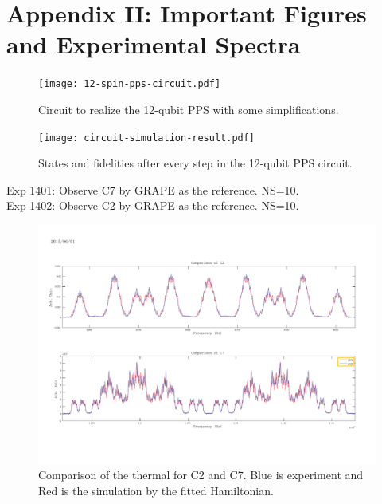 \clearpage
\section{Appendix II: Important Figures and Experimental Spectra}

\begin{figure}[htb]
\begin{center}
\texttt{[image: 12-spin-pps-circuit.pdf]}
\end{center}
\setlength{\abovecaptionskip}{-0.35cm}
\caption{\footnotesize{Circuit to realize the 12-qubit PPS with some simplifications.}}\label{12-spin-pps-circuit}
\end{figure}

\begin{figure}[htb]
\begin{center}
\texttt{[image: circuit-simulation-result.pdf]}
\end{center}
\setlength{\abovecaptionskip}{-0.35cm}
\caption{\footnotesize{States and fidelities after every step in the 12-qubit PPS circuit.}}\label{circuit-simulation-result}
\end{figure}

\clearpage
Exp 1401: Observe C7 by GRAPE as the reference. NS=10.\\
Exp 1402: Observe C2 by GRAPE as the reference. NS=10. \\

\begin{figure}[htb]
\begin{center}
\includegraphics[width=\columnwidth]{Thermal_C2andC7.pdf}
\end{center}
\setlength{\abovecaptionskip}{-0.35cm}
\caption{\footnotesize{Comparison of the thermal for C2 and C7. Blue is experiment and Red is the simulation by the fitted Hamiltonian.}}\label{1401and1402}
\end{figure}

